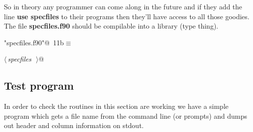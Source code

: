 \documentclass[10pt,a4paper,notitlepage]{article}
\newcommand{\code}[1]{\textbf{\textsf{#1}}} %
\begin{document}
\begin{flushleft}
\begin{minipage}{\linewidth}
\begin{list}{}{\setlength{\itemsep}{-\parsep}\setlength{\itemindent}{-\leftmargin}}
\item{}
\end{list}
\end{minipage}\vspace{4ex}
\end{flushleft}
So in theory any programmer can come along in the future and if they add the 
line \code{use specfiles} to their programs then they'll have access to all 
those goodies. The file \code{specfiles.f90} should be compilable into 
a library (type thing).

\begin{flushleft} \small
\begin{minipage}{\linewidth}\label{scrap13}\raggedright\small
{} \verb@"specfiles.f90"@\nobreak\ {\footnotesize {11b}}$\equiv$
\vspace{-1ex}
\begin{list}{}{} \item
\mbox{}\verb@@\hbox{$\langle\,${\it specfiles}\nobreak\ {\footnotesize {}}$\,\rangle$}\verb@                                                              @{\NWsep}
\end{list}
\vspace{-1.5ex}
\footnotesize
\begin{list}{}{\setlength{\itemsep}{-\parsep}\setlength{\itemindent}{-\leftmargin}}

\item{}
\end{list}
\end{minipage}\vspace{4ex}
\end{flushleft}
\subsection{Test program}
In order to check the routines in this section are working we have a simple 
program which gets a file name from the command line (or prompts)
and dumps out header and column information on stdout. 
\end{document}
